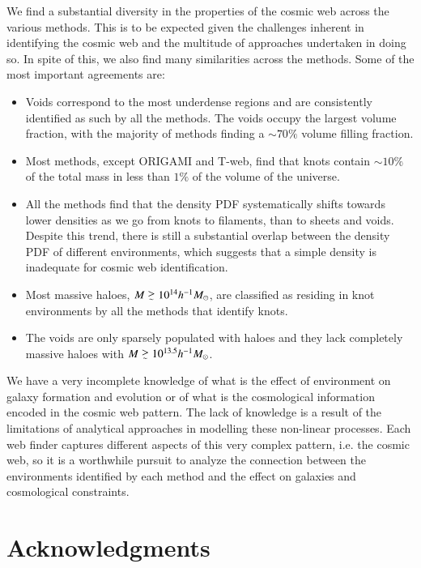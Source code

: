 \documentclass[useAMS,usenatbib]{mnras}
\def\gsim{\mathrel{\lower0.6ex\hbox{$\buildrel {\textstyle >}
 \over {\scriptstyle \sim}$}}}
\newcommand{\origami}{\textsc{ORIGAMI}}
\newcommand{\tweb}{T-web}
\begin{document}
We find a substantial diversity in the properties of the cosmic web across the various methods. This is to be expected given the challenges inherent in identifying the cosmic web and the multitude of approaches undertaken in doing so. In spite of this, we also find many similarities across the methods. Some of the most important agreements are:
\begin{itemize}
	\item Voids correspond to the most underdense regions and are consistently identified as such by all the methods. The voids occupy the largest volume fraction, with the majority of methods finding a ${\sim}70\%$ volume filling fraction.
	\item Most methods, except \origami{} and \tweb{}, find that knots contain ${\sim}10\%$ of the total mass in less than $1\%$ of the volume of the universe.
	\item All the methods find that the density PDF systematically shifts towards lower densities as we go from knots to filaments, than to sheets and voids. Despite this trend, there is still a substantial overlap between the density PDF of different environments, which suggests that a simple density is inadequate for cosmic web identification. 
	\item Most massive haloes, $M\gsim10^{14}h^{-1}M_{\odot}$, are classified as residing in knot environments by all the methods that identify knots.
	\item The voids are only sparsely populated with haloes and they lack completely massive haloes with $M\gsim10^{13.5}h^{-1}M_{\odot}$.
\end{itemize}

We have a very incomplete knowledge of what is the effect of environment on galaxy formation and evolution or of what is the cosmological information encoded in the cosmic web pattern. The lack of knowledge is a result of the limitations of analytical approaches in modelling these non-linear processes. Each web finder captures different aspects of this very complex pattern, i.e. the cosmic web, so     it is a worthwhile pursuit to analyze the connection between the environments identified by each method and the effect on galaxies and cosmological constraints.


\section*{Acknowledgments}
 
\end{document}
